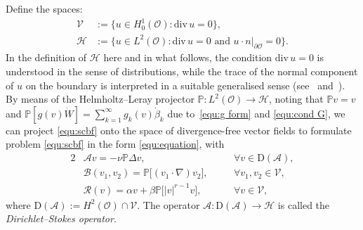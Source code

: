 \documentclass[11pt, reqno]{amsart}
\theoremstyle{definition}
\numberwithin{equation}{section}
\newcommand{\bb}{\mathbb}
\newcommand{\divg}{\mathrm{div}\,}
\begin{document}
Define the spaces:
\begin{align*}
    \mathcal{V} &:= \{u\in H^1_0(\mathscr{O}): \divg u=0\},
    \\
    \mathcal{H} &:= \{u\in L^2(\mathscr{O}) : \divg u=0 \text{ and } \left. u\cdot n \right|_{\partial \mathscr{O}}= 0\}.
\end{align*}
In the definition of $\mathcal{H}$ here and in what follows, the condition $\divg u=0$ is understood in the sense of distributions, while the trace of the normal component of $u$ on the boundary is interpreted in a suitable generalised sense (see~\cite[Chapter I, Section~1.3]{Tem01} and~\cite[Section~III.2]{Gal11}).
By means of the Helmholtz--Leray projector $\bb{P}:L^2(\mathscr{O}) \to \mathcal{H}$, noting that $\bb{P}v=v$ and $\bb{P}[g(v)\dot{W}]= \sum_{k=1}^\infty g_k(v)\dot{\beta}_k$ due to~\eqref{equ:g form} and \eqref{equ:cond G}, we can project \eqref{equ:scbf} onto the space of divergence-free vector fields to formulate problem \eqref{equ:scbf} in the form \eqref{equ:equation}, with
\begin{alignat}{2}
    &\mathcal{A}v =
    -\nu\bb{P}\Delta v,
    &\quad &\forall v\in\mathrm{D}(\mathcal{A}),
    \label{equ:A v}
    \\
    \label{equ:B v1 v2}
    &\mathcal{B}(v_1,v_2) = \bb{P}\big[(v_1\cdot\nabla)v_2\big],&\quad &\forall v_1,v_2 \in \mathcal{V},
    \\
    \label{equ:Rv scbf}
    &\mathcal{R}(v)
    = \alpha v+ \beta \bb{P} \big[ |v|^{r-1} v \big], &\quad &\forall v\in \mathcal{V},
\end{alignat}
where $\mathrm{D}(\mathcal{A}) := H^2(\mathscr{O})\cap \mathcal{V}$.
The operator $\mathcal{A}:\mathrm{D}(\mathcal{A})\to\mathcal{H}$ is called the \emph{Dirichlet--Stokes operator}.
\end{document}
